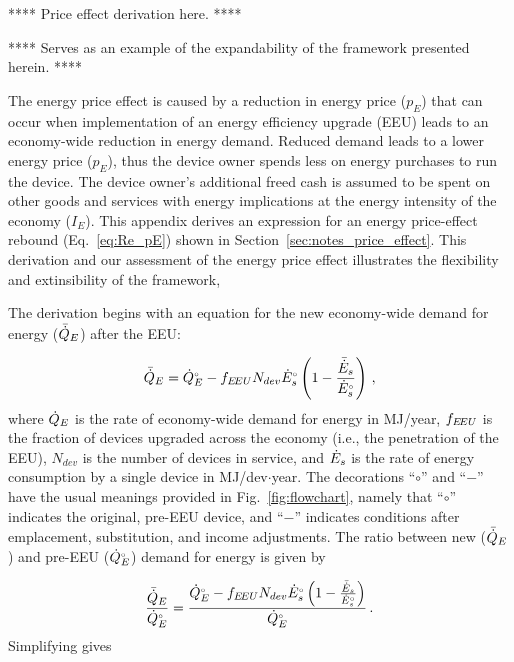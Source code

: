 

**** Price effect derivation here. ****

**** Serves as an example of the expandability 
of the framework presented herein. ****


The energy price effect is caused by a reduction 
in energy price ($p_E$)
that can occur when implementation of an
energy efficiency upgrade (EEU)
leads to an economy-wide reduction in energy demand.
Reduced demand leads to a lower energy price ($p_E$), 
thus the device owner spends less on energy purchases
to run the device.
The device owner's additional freed cash
is assumed to be spent on other goods and services
with energy implications 
at the energy intensity of the economy ($I_E$).
This appendix derives an expression for an
energy price-effect rebound (Eq.~\ref{eq:Re_pE})
shown in Section~\ref{sec:notes_price_effect}.
This derivation and our assessment of the energy price effect
illustrates the flexibility and extinsibility of the framework,

The derivation begins with an equation for the new economy-wide 
demand for energy ($\bar{\dot{Q}}_E$) after the EEU:

\begin{equation}
  \bar{\dot{Q}}_E = {}{\dot{Q}}^{\scriptscriptstyle \circ}_E - f_{E\!EU} N_{dev} {}{\dot{E}}^{\scriptscriptstyle \circ}_s \left( 1 - \frac{\bar{\dot{E}}_s}{{}{\dot{E}}^{\scriptscriptstyle \circ}_s} \right) \, ,
\end{equation}
%
where 
$\dot{Q}_E$ is the rate of economy-wide demand for energy in MJ/year,
$f_{E\!EU}$ is the fraction of devices upgraded across the economy
(i.e., the penetration of the EEU), 
$N_{dev}$ is the number of devices in service, and
$\dot{E}_s$ is the rate of energy consumption by a single device in MJ/dev$\cdot$year.
The decorations ``$\circ$'' and ``$-$'' have the usual meanings
provided in Fig.~\ref{fig:flowchart}, namely that
``$\circ$'' indicates the original, pre-EEU device, and 
``$-$'' indicates conditions after 
emplacement, substitution, and income
adjustments.
The ratio between 
new ($\bar{\dot{Q}}_E$) and
pre-EEU (${}{\dot{Q}}^{\scriptscriptstyle \circ}_E$) 
demand for energy is given by

\begin{equation}
  \frac{\bar{\dot{Q}}_E}{{}{\dot{Q}}^{\scriptscriptstyle \circ}_E} =
        \frac{{}{\dot{Q}}^{\scriptscriptstyle \circ}_E - f_{E\!EU} N_{dev} {}{\dot{E}}^{\scriptscriptstyle \circ}_s \left( 1 - \frac{\bar{\dot{E}}_s}{{}{\dot{E}}^{\scriptscriptstyle \circ}_s}  \right)}
        {{}{\dot{Q}}^{\scriptscriptstyle \circ}_E} \, .
\end{equation}
%
Simplifying gives

